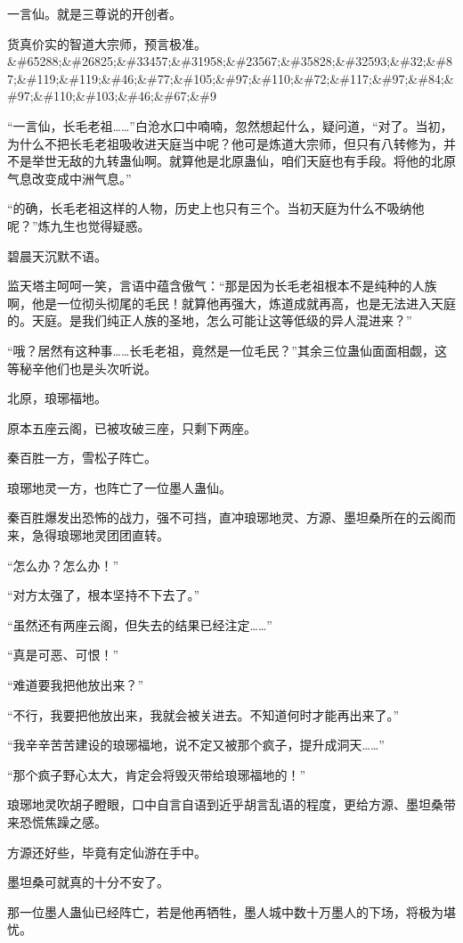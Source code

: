 \begin{this_body}
一言仙。就是三尊说的开创者。

货真价实的智道大宗师，预言极准。\&\#65288;\&\#26825;\&\#33457;\&\#31958;\&\#23567;\&\#35828;\&\#32593;\&\#32;\&\#87;\&\#119;\&\#119;\&\#46;\&\#77;\&\#105;\&\#97;\&\#110;\&\#72;\&\#117;\&\#97;\&\#84;\&\#97;\&\#110;\&\#103;\&\#46;\&\#67;\&\#9

“一言仙，长毛老祖……”白沧水口中喃喃，忽然想起什么，疑问道，“对了。当初，为什么不把长毛老祖吸收进天庭当中呢？他可是炼道大宗师，但只有八转修为，并不是举世无敌的九转蛊仙啊。就算他是北原蛊仙，咱们天庭也有手段。将他的北原气息改变成中洲气息。”

“的确，长毛老祖这样的人物，历史上也只有三个。当初天庭为什么不吸纳他呢？”炼九生也觉得疑惑。

碧晨天沉默不语。

监天塔主呵呵一笑，言语中蕴含傲气：“那是因为长毛老祖根本不是纯种的人族啊，他是一位彻头彻尾的毛民！就算他再强大，炼道成就再高，也是无法进入天庭的。天庭。是我们纯正人族的圣地，怎么可能让这等低级的异人混进来？”

“哦？居然有这种事……长毛老祖，竟然是一位毛民？”其余三位蛊仙面面相觑，这等秘辛他们也是头次听说。

北原，琅琊福地。

原本五座云阁，已被攻破三座，只剩下两座。

秦百胜一方，雪松子阵亡。

琅琊地灵一方，也阵亡了一位墨人蛊仙。

秦百胜爆发出恐怖的战力，强不可挡，直冲琅琊地灵、方源、墨坦桑所在的云阁而来，急得琅琊地灵团团直转。

“怎么办？怎么办！”

“对方太强了，根本坚持不下去了。”

“虽然还有两座云阁，但失去的结果已经注定……”

“真是可恶、可恨！”

“难道要我把他放出来？”

“不行，我要把他放出来，我就会被关进去。不知道何时才能再出来了。”

“我辛辛苦苦建设的琅琊福地，说不定又被那个疯子，提升成洞天……”

“那个疯子野心太大，肯定会将毁灭带给琅琊福地的！”

琅琊地灵吹胡子瞪眼，口中自言自语到近乎胡言乱语的程度，更给方源、墨坦桑带来恐慌焦躁之感。

方源还好些，毕竟有定仙游在手中。

墨坦桑可就真的十分不安了。

那一位墨人蛊仙已经阵亡，若是他再牺牲，墨人城中数十万墨人的下场，将极为堪忧。


\end{this_body}

